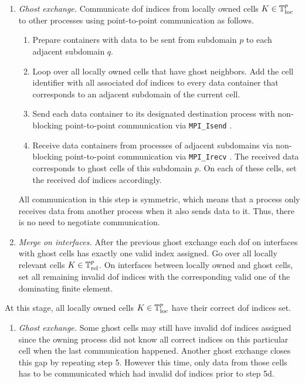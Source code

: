 \begin{enumerate}[resume]
  \item \textit{Ghost exchange.}
  Communicate \gls{dof} indices from locally owned cells $K \in \mathbb{T}^p_{\text{loc}}$ to other processes using point-to-point communication as follows.
  \begin{enumerate}[label=\alph*.]
    \item Prepare containers with data to be sent from subdomain $p$ to each adjacent subdomain $q$.
    \item Loop over all locally owned cells that have ghost neighbors. Add the cell identifier with all associated \gls{dof} indices to every data container that corresponds to an adjacent subdomain of the current cell.
    \item Send each data container to its designated destination process with non-blocking point-to-point communication via \texttt{MPI\_Isend} \textcite{mpi31}.
    \item Receive data containers from processes of adjacent subdomains via non-blocking point-to-point communication via \texttt{MPI\_Irecv} \textcite{mpi31}. The received data corresponds to ghost cells of this subdomain $p$. On each of these cells, set the received \gls{dof} indices accordingly.
  \end{enumerate}
  All communication in this step is symmetric, which means that a process only receives data from another process when it also sends data to it. Thus, there is no need to negotiate communication.
  \item \textit{Merge on interfaces.}
  After the previous ghost exchange each \gls{dof} on interfaces with ghost cells has exactly one valid index assigned. Go over all locally relevant cells $K \in \mathbb{T}^p_{\text{rel}}$. On interfaces between locally owned and ghost cells, set all remaining invalid \gls{dof} indices with the corresponding valid one of the dominating finite element.
\end{enumerate}
At this stage, all locally owned cells $K \in \mathbb{T}^p_{\text{loc}}$ have their correct \gls{dof} indices set.
\begin{enumerate}[resume]
  \item \textit{Ghost exchange.}
  Some ghost cells may still have invalid \gls{dof} indices assigned since the owning process did not know all correct indices on this particular cell when the last communication happened. Another ghost exchange closes this gap by repeating step 5. However this time, only data from those cells has to be communicated which had invalid \gls{dof} indices prior to step 5d.
\end{enumerate}
